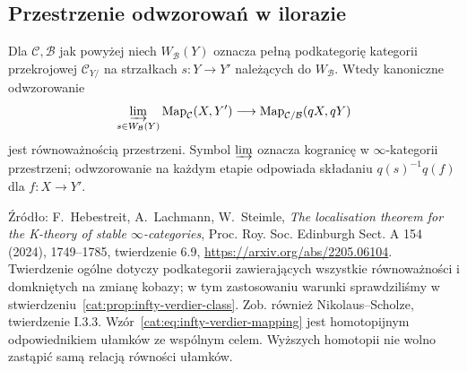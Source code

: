 \subsection{Przestrzenie odwzorowań w ilorazie}

\begin{twierdzenie}\label{cat:thm:infty-verdier-mapping}
Dla $\mathcal C,\mathcal B$ jak powyżej niech $W_{\mathcal B}(Y)$ oznacza pełną podkategorię kategorii przekrojowej $\mathcal C_{Y/}$ na strzałkach $s:Y\to Y'$ należących do $W_{\mathcal B}$. Wtedy kanoniczne odwzorowanie
\begin{equation}\label{cat:eq:infty-verdier-mapping}
 \varinjlim_{s\in W_{\mathcal B}(Y)}\operatorname{Map}_{\mathcal C}(X,Y')
 \longrightarrow \operatorname{Map}_{\mathcal C/\mathcal B}(qX,qY)
\end{equation}
jest równoważnością przestrzeni. Symbol $\varinjlim$ oznacza kogranicę w $\infty$-kategorii przestrzeni; odwzorowanie na każdym etapie odpowiada składaniu $q(s)^{-1}q(f)$ dla $f:X\to Y'$.
\end{twierdzenie}

Źródło: F.~Hebestreit, A.~Lachmann, W.~Steimle, \emph{The localisation theorem for the K-theory of stable $\infty$-categories}, Proc. Roy. Soc. Edinburgh Sect. A 154 (2024), 1749--1785, twierdzenie 6.9, \url{https://arxiv.org/abs/2205.06104}. Twierdzenie ogólne dotyczy podkategorii zawierających wszystkie równoważności i domkniętych na zmianę kobazy; w tym zastosowaniu warunki sprawdziliśmy w stwierdzeniu~\ref{cat:prop:infty-verdier-class}. Zob. również Nikolaus--Scholze, twierdzenie I.3.3. Wzór~\eqref{cat:eq:infty-verdier-mapping} jest homotopijnym odpowiednikiem ułamków ze wspólnym celem. Wyższych homotopii nie wolno zastąpić samą relacją równości ułamków.

